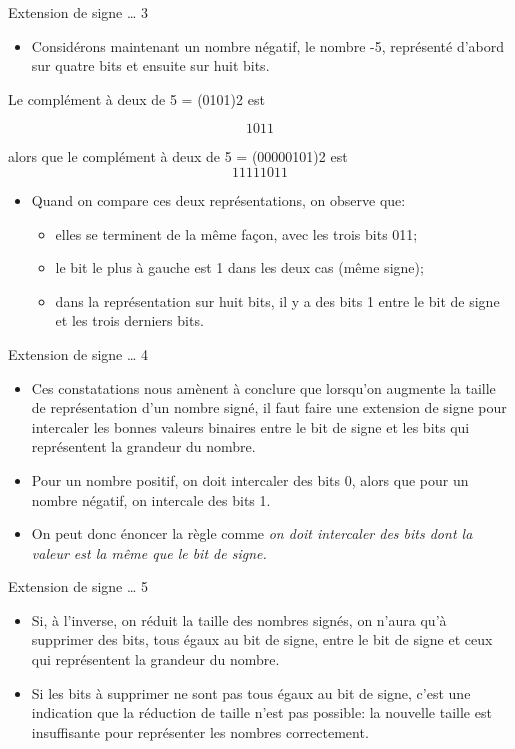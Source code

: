 \documentclass[presentation]{beamer}
\begin{document}
\begin{frame}[label={sec:org9f97438}]{Extension de signe \ldots{} 3}
\begin{itemize}
\item Considérons maintenant un nombre négatif, le nombre -5, représenté d'abord sur quatre bits et ensuite sur huit bits.
\end{itemize}

Le complément à deux de 5 = (0101)2 est

$$ 1011 $$

alors que le complément à deux de 5 = (00000101)2 est $$ 11111011 $$

\begin{itemize}
\item Quand on compare ces deux représentations, on observe que: 

\begin{itemize}
\item elles se terminent de la même façon, avec les trois bits 011;
\item le bit le plus à gauche est 1 dans les deux cas (même signe);
\item dans la représentation sur huit bits, il y a des bits 1 entre le bit de signe et les trois derniers bits.
\end{itemize}
\end{itemize}
\end{frame}

\begin{frame}[label={sec:orgc9b304a}]{Extension de signe \ldots{} 4}
\begin{itemize}
\item Ces constatations nous amènent à conclure que lorsqu'on augmente la taille de représentation d'un nombre signé, il faut faire une \alert{extension de signe} pour intercaler les bonnes valeurs binaires entre le bit de signe et les bits qui représentent la grandeur du nombre.

\item Pour un nombre positif, on doit intercaler des bits 0, alors que pour un nombre négatif, on intercale des bits 1.

\item On peut donc énoncer la règle comme \emph{on doit intercaler des bits dont la valeur est la même que le bit de signe.}
\end{itemize}
\end{frame}

\begin{frame}[label={sec:org33c3a94}]{Extension de signe \ldots{} 5}
\begin{itemize}
\item Si, à l'inverse, on réduit la taille des nombres signés, on n'aura qu'à supprimer des bits, tous égaux au bit de signe, entre le bit de signe et ceux qui représentent la grandeur du nombre.

\item Si les bits à supprimer ne sont pas tous égaux au bit de signe, c'est une indication que la réduction de taille n'est pas possible: la nouvelle taille est insuffisante pour représenter les nombres correctement.
\end{itemize}
\end{frame}
\end{document}
